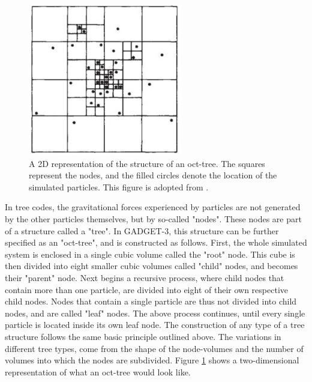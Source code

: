 \documentclass[english, twoside]{HYgradu}
\begin{document}
\begin{figure}
	\centering	
	\includegraphics[width=0.6\textwidth]{barnes_octtree.png}	
	\caption{A 2D representation of the structure of an oct-tree. The squares represent the nodes, and the filled circles denote the location of the simulated particles. This figure is adopted from \cite{Barnes1986}.}
	\label{figure:oct_tree}
\end{figure}

In tree codes, the gravitational forces experienced by particles are not generated by the other particles themselves, but by so-called "nodes". These nodes are part of a structure called a "tree". In GADGET-3, this structure can be further specified as an "oct-tree", and is constructed as follows. First, the whole simulated system is enclosed in a single cubic volume called the "root" node. This cube is then divided into eight smaller cubic volumes called "child" nodes, and becomes their "parent" node. Next begins a recursive process, where child nodes that contain more than one particle, are divided into eight of their own respective child nodes. Nodes that contain a single particle are thus not divided into child nodes, and are called "leaf" nodes. The above process continues, until every single particle is located inside its own leaf node. The construction of any type of a tree structure follows the same basic principle outlined above. The variations in different tree types, come from the shape of the node-volumes and the number of volumes into which the nodes are subdivided. Figure \ref{figure:oct_tree} shows a two-dimensional representation of what an oct-tree would look like. 
\end{document}
